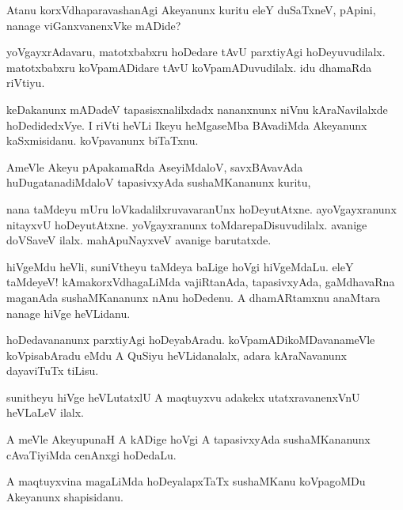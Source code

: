 \documentclass{article}
\begin{document}
\begin{mn}
Atanu  korxVdhaparavashanAgi Akeyanunx kuritu eleY duSaTxneV, pApini, nanage viGanxvanenxVke mADide?
\end{mn}

\begin{mn}
yoVgayxrAdavaru, matotxbabxru hoDedare tAvU parxtiyAgi hoDeyuvudilalx.  
matotxbabxru koVpamADidare tAvU koVpamADuvudilalx.  idu dhamaRda riVtiyu.
\end{mn}

\begin{mn}
keDakanunx mADadeV tapasisxnalilxdadx  nananxnunx niVnu kAraNavilalxde hoDedidedxVye.  
I riVti heVLi Ikeyu  heMgaseMba BAvadiMda  Akeyanunx kaSxmisidanu.  koVpavanunx biTaTxnu.
\end{mn}

\begin{mn}
AmeVle Akeyu  pApakamaRda AseyiMdaloV, savxBAvavAda huDugatanadiMdaloV tapasivxyAda sushaMKananunx kuritu,
\end{mn}

\begin{mn}
nana taMdeyu mUru loVkadalilxruvavaranUnx  hoDeyutAtxne.  ayoVgayxranunx 
nitayxvU hoDeyutAtxne.  yoVgayxranunx toMdarepaDisuvudilalx.  
avanige doVSaveV ilalx.  mahApuNayxveV avanige barutatxde.
\end{mn}

\begin{mn}
hiVgeMdu heVli, suniVtheyu taMdeya baLige hoVgi hiVgeMdaLu.  eleY taMdeyeV! 
kAmakorxVdhagaLiMda vajiRtanAda, tapasivxyAda, gaMdhavaRna maganAda  
sushaMKananunx nAnu hoDedenu.  A dhamARtamxnu anaMtara nanage hiVge heVLidanu.
\end{mn}

\begin{mn}
hoDedavananunx parxtiyAgi  hoDeyabAradu.  koVpamADikoMDavanameVle 
koVpisabAradu eMdu  A QuSiyu heVLidanalalx, adara kAraNavanunx dayaviTuTx tiLisu.
\end{mn}

\begin{mn}
sunitheyu hiVge heVLutatxlU A maqtuyxvu adakekx utatxravanenxVnU heVLaLeV ilalx. 
\end{mn}

\begin{mn}
A meVle AkeyupunaH A kADige hoVgi A tapasivxyAda sushaMKananunx cAvaTiyiMda cenAnxgi hoDedaLu. 
\end{mn}

\begin{mn}
A maqtuyxvina magaLiMda  hoDeyalapxTaTx sushaMKanu koVpagoMDu Akeyanunx shapisidanu. 
\end{mn}
\end{document}
